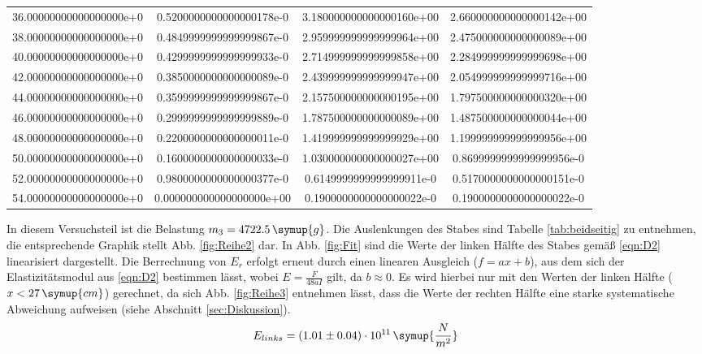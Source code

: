\begin{table}
\begin{tabular}{S S S S}
    36.00000000000000000e+0 & 0.5200000000000000178e-0 & 3.180000000000000160e+00 & 2.660000000000000142e+00\\
    38.00000000000000000e+0 & 0.4849999999999999867e-0 & 2.959999999999999964e+00 & 2.475000000000000089e+00\\
    40.00000000000000000e+0 & 0.4299999999999999933e-0 & 2.714999999999999858e+00 & 2.284999999999999698e+00\\
    42.00000000000000000e+0 & 0.3850000000000000089e-0 & 2.439999999999999947e+00 & 2.054999999999999716e+00\\
    44.00000000000000000e+0 & 0.3599999999999999867e-0 & 2.157500000000000195e+00 & 1.797500000000000320e+00\\
    46.00000000000000000e+0 & 0.2999999999999999889e-0 & 1.787500000000000089e+00 & 1.487500000000000044e+00\\
    48.00000000000000000e+0 & 0.2200000000000000011e-0 & 1.419999999999999929e+00 & 1.199999999999999956e+00\\
    50.00000000000000000e+0 & 0.1600000000000000033e-0 & 1.030000000000000027e+00 & 0.8699999999999999956e-0\\
    52.00000000000000000e+0 & 0.9800000000000000377e-0 & 0.6149999999999999911e-0 & 0.5170000000000000151e-0\\
    54.00000000000000000e+0 & 0.000000000000000000e+00 & 0.1900000000000000022e-0 & 0.1900000000000000022e-0\\
    \bottomrule
  \end{tabular}
\end{table}

In diesem Versuchsteil ist die Belastung $m_3 = 4722.5 \, \symup{g}$. Die Auslenkungen des Stabes sind Tabelle \ref{tab:beidseitig} zu entnehmen, die entsprechende Graphik stellt Abb. \ref{fig:Reihe2} dar. In Abb. \ref{fig:Fit} sind die Werte der linken Hälfte des Stabes gemäß \eqref{eqn:D2} linearisiert dargestellt.
Die Berrechnung von $E_r$ erfolgt erneut durch einen linearen Ausgleich ($f = ax +b$), aus dem sich der Elastizitätsmodul aus \eqref{eqn:D2} bestimmen lässt, wobei $E = \frac{F}{48aI}$ gilt, da $b \approx 0$. Es wird hierbei nur mit den Werten der linken Hälfte ($x<27 \, \symup{cm}$) gerechnet, da sich Abb. \ref{fig:Reihe3} entnehmen lässt, dass die Werte der rechten Hälfte eine starke systematische Abweichung aufweisen (siehe Abschnitt \ref{sec:Diskussion}).
\begin{equation*}
  E_{links} = \left(1.01 \pm 0.04 \right)\cdot 10^{11} \, \symup{\frac{N}{m^2}}
\end{equation*}


